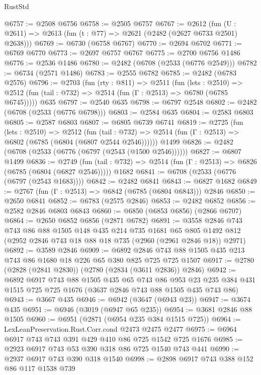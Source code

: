 \begin{lexlean}{RustStd}
\begin{coremodule}
@6757 := @2508 @6756
@6758 := @2505 @6757
@6767 := @2612 (fun (U : @2611) => @2613 (fun (t : @77) => @2621 (@2482 (@2627 @6733 @2501) @2638)))
@6769 := @6730 (@6758 @6767)
@6770 := @2694 @6702
@6771 := @6769 @6770
@6773 := @2697 @6757 @6767
@6775 := @2700 @6756 @1486
@6776 := @2536 @1486
@6780 := @2482 (@6708 (@2533 (@6776 @2549)))
@6782 := @6734 (@2571 @1486)
@6783 := @2555 @6782
@6785 := @2482 (@6783 @2576)
@6796 := @2703
    (fun (rty : @811) =>
    @2511
      (fun (lets : @2510) =>
      @2512 (fun (tail : @732) => @2514 (fun (Γ : @2513) => @6780 (@6785 @6745)))))
    @635
@6797 := @2540 @635
@6798 := @6797 @2548
@6802 := @2482 (@6708 (@2533 (@6776 @6798)))
@6803 := @2584 @635
@6804 := @2583 @6803
@6805 := @2587 @6803
@6807 := @6805 @6739 @6741
@6819 := @2725
    (fun (lets : @2510) =>
    @2512
      (fun (tail : @732) => @2514 (fun (Γ : @2513) => @6802 (@6785 (@6804 (@6807 @2544 @2546))))))
    @1499
@6826 := @2482 (@6708 (@2533 (@6776 (@6797 (@2543 (@1500 @2546))))))
@6827 := @6807 @1499
@6836 := @2749
    (fun (tail : @732) => @2514 (fun (Γ : @2513) => @6826 (@6785 (@6804 (@6827 @2546)))))
    @1682
@6841 := @6708 (@2533 (@6776 (@6797 (@2543 @1683))))
@6842 := @2482 @6841
@6843 := @6827 @1682
@6849 := @2767 (fun (Γ : @2513) => @6842 (@6785 (@6804 @6843))) @2846
@6850 := @2650 @6841
@6852 := @6783 (@2575 @2846)
@6853 := @2482 @6852
@6856 := @2582 @2846 @6803 @6843
@6860 := @6850 (@6853 @6856) (@2866 @6707)
@6864 := @2650 @6852 @6856 (@2871 @6782)
@6891 := @3558
    @2846
    @743
    @743
    @86
    @88
    @1505
    @148
    @435
    @214
    @735
    @1681
    @65
    @805
    @1492
    @812
    (@2952 @2846 @743 @18 @88 @18 @735 (@2960 (@2961 @2846 @18)) @2971)
@6892 := @3589 @2846
@6909 := @6892 @2846 @743 @88 @1505 @435 @213 @743 @86 @1680 @18 @226 @65 @380 @825 @725 @725 @1507
@6917 := @2780 (@2828 (@2841 @2830)) (@2780 (@2834 (@3611 @2836)) @2846)
@6942 := @6892
    @6917
    @743
    @88
    @1505
    @435
    @65
    @743
    @86
    @953
    @23
    @235
    @384
    @431
    @1515
    @725
    @725
    @1676
    (@3637 @2846 @743 @88 @1505 @435 @743 @86)
@6943 := @3667 @435
@6946 := @6942 (@3647 (@6943 @23))
@6947 := @3674 @435
@6951 := @6946 (@3019 (@6947 @65 @235))
@6954 := @3681 @2846 @88 @1505
@6960 := @6951 (@2871 (@6954 @235 @384 @1515 @725))
@6964 := LexLeanPreservation.Rust.Corr.cond @2473 @2475 @2477
@6975 := @6964 @6917 @743 @743 @391 @429 @410 @86 @725 @1542 @725 @1676
@6985 := @2923 @6917 @743 @53 @390 @318 @86 @725 @1540 @743 @441
@6990 := @2937 @6917 @743 @390 @318 @1540
@6998 := @2898 @6917 @743 @388 @152 @86 @117 @1538 @739

\end{coremodule}
\end{lexlean}
